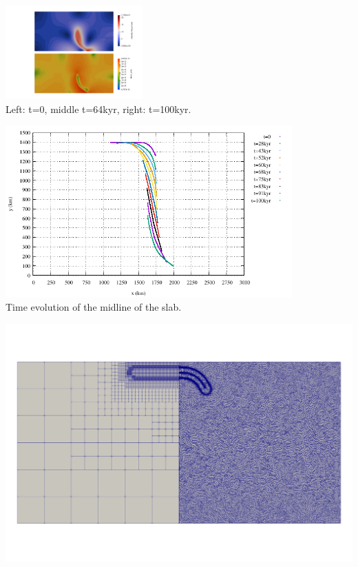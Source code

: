 \begin{center}
\includegraphics[width=5.26cm]{python_codes/fieldstone_55/images/aspect/vel_sr0180}\\
{\captionfont Left: t=0, middle t=64kyr, right: t=100kyr.}
\end{center}


\begin{center}
\includegraphics[width=11cm]{python_codes/fieldstone_55/images/mid_evolution}\\
{\captionfont Time evolution of the midline of the slab.}
\end{center}


\begin{center}
\includegraphics[width=14cm]{python_codes/fieldstone_55/images/meshes}
\end{center}

